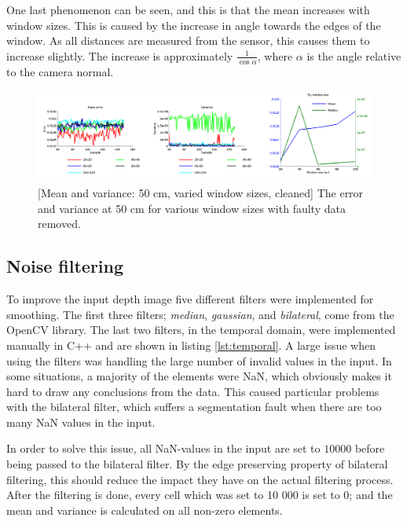 \documentclass[11pt]{article}
\begin{document}
One last phenomenon can be seen, and this is that the mean increases with window
sizes. This is caused by the increase in angle towards the edges of the
window. As all distances are measured from the sensor, this causes them to
increase slightly. The increase is approximately $\frac{1}{\cos \alpha}$, where
$\alpha$ is the angle relative to the camera normal.\par

\begin{figure}[ht]
  \centering
  \includegraphics[width=1\textwidth]{figures/plot2bywindowsize.png}
  [Mean and variance: 50 cm, varied window sizes,
  cleaned]{\label{fig:variedwindow2} The error and variance at 50 cm for various
    window sizes with faulty data removed.}
\end{figure}

\subsection{Noise filtering}

To improve the input depth image five different filters were implemented for
smoothing. The first three filters; \emph{median}, \emph{gaussian}, and
\emph{bilateral}, come from the OpenCV library. The last two filters, in the
temporal domain, were implemented manually in C++ and are shown in listing
\vref{lst:temporal}. A large issue when using the filters was handling the large
number of invalid values in the input. In some situations, a majority of the
elements were NaN, which obviously makes it hard to draw any conclusions from
the data. This caused particular problems with the bilateral filter, which
suffers a segmentation fault when there are too many NaN values in the
input. \par



In order to solve this issue, all NaN-values in the input are set to $10000$
before being passed to the bilateral filter. By the edge preserving property of
bilateral filtering, this should reduce the impact they have on the actual
filtering process. After the filtering is done, every cell which was set to 10
000 is set to 0; and the mean and variance is calculated on all non-zero
elements. \par
\end{document}
